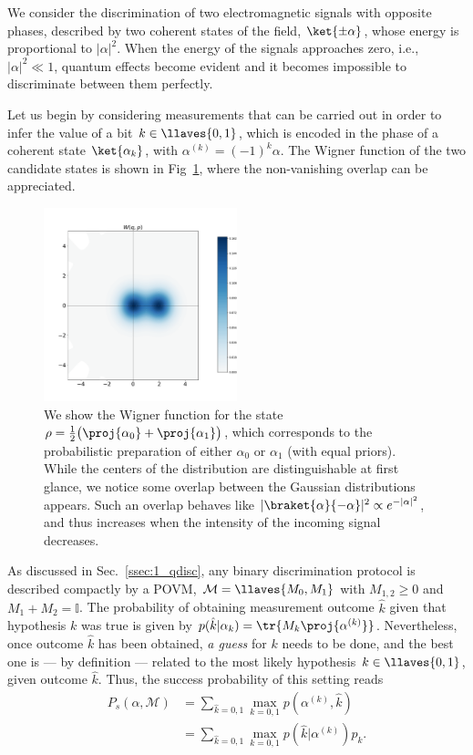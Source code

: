 We consider the discrimination of two electromagnetic signals with opposite phases, described by two coherent states of the field, $\ket{\pm\alpha}$, whose energy is proportional to $|\alpha|^{2}$. When the energy of the signals approaches zero, i.e., $|\alpha|^{2}\ll1$, quantum effects become evident and it becomes impossible to discriminate between them perfectly.

Let us begin by considering measurements that can be carried out in order to infer the value of a bit $k\in\llaves{0,1}$, which is encoded in the phase of a coherent state $\ket{\alpha_k}$, with $\alpha^{(k)} = (-1)^{k}\alpha$. The Wigner function of the two candidate states is shown in Fig~\ref{fig:wigner_312_coh_noiseless}, where the non-vanishing overlap can be appreciated.

\begin{figure}[t]
    \centering
    \includegraphics[width=0.5\textwidth]{Figures/312/wigner_coh_displaced.pdf}
    \caption{We show the Wigner function for the state $\rho = \frac{1}{2}\big(\proj{\alpha_0} + \proj{\alpha_1}\big)$, which corresponds to the probabilistic preparation of either $\alpha_0$ or $\alpha_1$ (with equal priors). While the centers of the distribution are distinguishable at first glance, we notice some overlap between the Gaussian distributions appears. Such an overlap behaves like $|\braket{\alpha}{-\alpha}|^2 \propto e^{-|\alpha|^2}$, and thus increases when the intensity of the incoming signal decreases.}
    \label{fig:wigner_312_coh_noiseless}
\end{figure}

As discussed in Sec.~\ref{ssec:1_qdisc}, any binary discrimination protocol is described compactly by a POVM, $\mathcal{M}=\llaves{M_{0},M_{1}}$ with $M_{1,2}\geq0$ and $M_{1}+M_{2}=\mathbb{I}$. The probability of obtaining measurement outcome $\hat{k}$ given that hypothesis $k$ was true is given by $p(\hat{k}|\alpha_k) = \tr{M_k \proj{\alpha^{(k)}}}$.
Nevertheless, once outcome $\hat{k}$ has been obtained, \textit{a guess} for $k$ needs to be done, and the best one is --- by definition ---  related to the most likely hypothesis $k\in\llaves{0,1}$, given outcome $\hat{k}$. Thus, the success probability of this setting reads
\begin{align}
P_{s}(\alpha,\mathcal{M})&=\sum_{\hat{k}=0,1}\max_{k=0,1}p(\alpha^{(k)},\hat{k})\\
&=\sum_{\hat{k}=0,1}\max_{k=0,1}p(\hat{k}|\alpha^{(k)})p_{k}.
\end{align}
